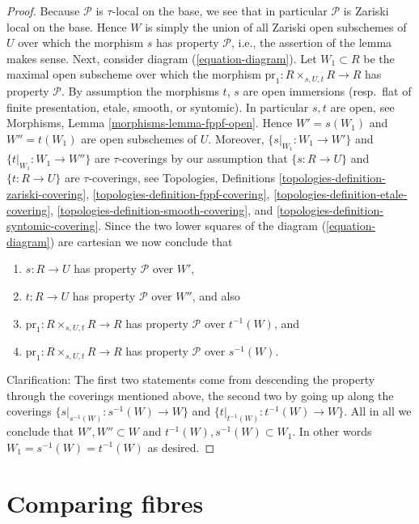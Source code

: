 \begin{proof}
Because $\mathcal{P}$ is $\tau$-local on the base, we see that in particular
$\mathcal{P}$ is Zariski local on the base. Hence $W$ is simply the union
of all Zariski open subschemes of $U$ over which the morphism $s$ has property
$\mathcal{P}$, i.e., the assertion of the lemma makes sense.
Next, consider
diagram (\ref{equation-diagram}).
Let $W_1 \subset R$ be the maximal open subscheme over which the morphism
$\text{pr}_1 : R \times_{s, U, t} R \to R$ has property $\mathcal{P}$.
By assumption the morphisms $t$, $s$ are open immersions
(resp.\ flat of finite presentation, etale, smooth, or syntomic).
In particular $s, t$ are open, see
Morphisms, Lemma \ref{morphisms-lemma-fppf-open}.
Hence $W' = s(W_1)$ and $W'' = t(W_1)$ are open subschemes of $U$.
Moreover, $\{s|_{W_1} : W_1 \to W'\}$ and $\{t|_{W_1} : W_1 \to W''\}$
are $\tau$-coverings by our assumption that
$\{s : R \to U\}$ and $\{t : R \to U\}$ are $\tau$-coverings, see
Topologies, Definitions
\ref{topologies-definition-zariski-covering},
\ref{topologies-definition-fppf-covering},
\ref{topologies-definition-etale-covering},
\ref{topologies-definition-smooth-covering}, and
\ref{topologies-definition-syntomic-covering}.
Since the two lower squares of the
diagram (\ref{equation-diagram})
are cartesian we now conclude that
\begin{enumerate}
\item $s : R \to U$ has property $\mathcal{P}$ over $W'$,
\item $t : R \to U$ has property $\mathcal{P}$ over $W''$, and also
\item $\text{pr}_1 : R \times_{s, U, t} R \to R$ has property
$\mathcal{P}$ over $t^{-1}(W)$, and
\item $\text{pr}_1 : R \times_{s, U, t} R \to R$ has property
$\mathcal{P}$ over $s^{-1}(W)$.
\end{enumerate}
Clarification: The first two statements come from descending the property
through the coverings mentioned above, the second two by going up along the
coverings $\{s|_{s^{-1}(W)} : s^{-1}(W) \to W\}$ and
$\{t|_{t^{-1}(W)} : t^{-1}(W) \to W\}$.
All in all we conclude that
$W', W'' \subset W$ and $t^{-1}(W), s^{-1}(W) \subset W_1$. In other words
$W_1 = s^{-1}(W) = t^{-1}(W)$ as desired.
\end{proof}



\section{Comparing fibres}
\label{section-fibres}


